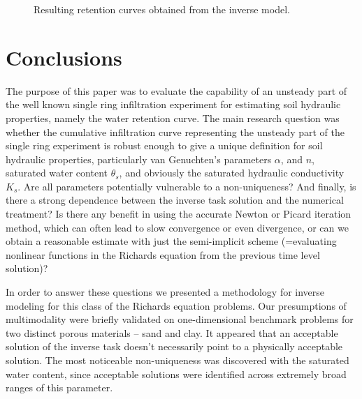 \documentclass[review]{elsarticle}
\begin{document}
\begin{figure}
\centering
{}
\caption{Resulting retention curves obtained from the inverse model.}
\label{retc-final}
\end{figure}

\section{Conclusions}

The purpose of this paper was to evaluate the capability of an unsteady part of the well known single ring infiltration experiment for estimating  soil hydraulic properties, namely the water retention curve. The main research question was whether the cumulative infiltration curve representing the unsteady part of the single ring experiment is robust enough to give a unique definition for soil hydraulic properties, particularly van Genuchten's parameters $\alpha$, and $n$, saturated water content $\theta_s$, and obviously the saturated hydraulic conductivity $K_s$. 
  Are all parameters potentially vulnerable to a non-uniqueness? And finally, is there a strong dependence between the inverse task solution and the numerical treatment? Is there any benefit in using the accurate Newton or Picard iteration method, which can often lead to slow convergence or even divergence, or can we obtain a reasonable estimate with just the semi-implicit scheme (=evaluating  nonlinear functions in the Richards equation from the previous time level solution)?
  
In order to answer these questions we presented a methodology for inverse modeling for this class of the Richards equation problems. Our  presumptions of multimodality were briefly validated on one-dimensional benchmark problems for two distinct porous materials -- sand and clay. It appeared that an acceptable solution of the inverse task   doesn't necessarily point to a physically acceptable solution. The most noticeable non-uniqueness was discovered with the saturated water content, since  acceptable solutions were identified across  extremely broad ranges  of this parameter.
  
\end{document}

